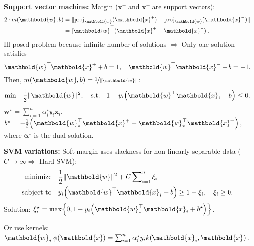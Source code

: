 \documentclass[9pt]{extarticle}
\newenvironment{topic}[1]
{\textbf{\sffamily \colorbox{black}{\rlap{\textbf{\textcolor{white}{#1}}}\hspace{\linewidth}\hspace{-2\fboxsep}}}}
{}
\newenvironment{subtopic}[1]
{\textbf{\sffamily #1:}}
{}
\renewcommand{\vec}[1]{\ensuremath{\mathbold{#1}}}
\begin{document}
\begin{multicols*}{3}
\begin{topic}{Convex optimization and SVMs}
\begin{subtopic}{Support vector machine}
            Margin ($\vec{x}^+$ and $\vec{x}^-$ are support vectors):
            \begin{align*}
                2 \cdot m(\vec{w},b) & = \| \mathrm{proj}_{\vec{w}}(\vec{x}^+) - \mathrm{proj}_{\vec{w}}(\vec{x}^-) \| \\
                                     & = |\transpose{\bar{\vec{w}}} (\vec{x}^+ - \vec{x}^-)|.
            \end{align*}
            Ill-posed problem because infinite number of solutions $\Rightarrow$ Only one solution satisfies \[
                \transpose{\vec{w}} \vec{x}^+ +b = 1, \quad \transpose{\vec{w}} \vec{x}^- + b = -1.
            \]
            Then, $m(\vec{w},b) = \nicefrac{1}{\| \vec{w} \|}$: \[
                \text{min} \quad \frac{1}{2} \| \vec{w} \|^2, \quad \text{s.t.} \quad 1 - y_i \lft( \transpose{\vec{w}}\vec{x}_i + b \rgt) \leq 0.
            \]
            $\vec{w}^\star = \sum_{i=1}^{n} \alpha^\star_i y_i \vec{x}_i$, $b^\star = -\frac{1}{2} \lft( \transpose{\vec{w}_{\star}} \vec{x}^+ + \transpose{\vec{w}_{\star}} \vec{x}^- \rgt)$,
            where $\vec{\alpha}^\star$ is the dual solution.

        \end{subtopic}

        \begin{subtopic}{SVM variations}
            Soft-margin uses slackness for non-linearly separable data ($C \to \infty \Rightarrow$ Hard SVM):
            \begin{align*}
                \text{minimize}   & \quad \frac{1}{2} \| \vec{w} \|^2 + C \sum\nolimits_{i=1}^{n} \xi_i                                \\
                \text{subject to} & \quad y_i \lft(\transpose{\vec{w}} \vec{x}_i +b \rgt) \geq 1 - \xi_i, \quad \xi_i \geq 0.
            \end{align*}
            Solution: $\xi_i^\star = \max \lft\{ 0, 1 - y_i \lft(\transpose{\vec{w}_{\star}} \vec{x}_i + b^\star\rgt) \rgt\}$.

            Or use kernels: $\transpose{\vec{w}_{\star}}
                \phi(\vec{x}) = \sum_{i=1}^{n} \alpha_i^\star y_i k(\vec{x}_i, \vec{x})$.


\end{subtopic}
\end{topic}
\end{multicols*}
\end{document}
